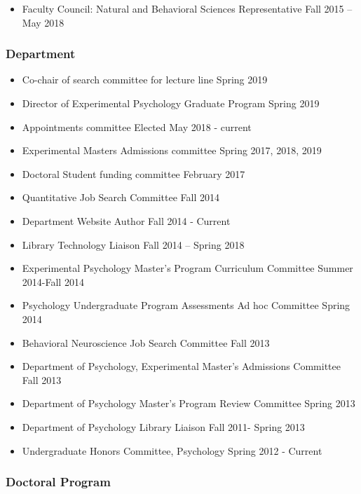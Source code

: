 \documentclass[11pt,a4paper,]{moderncv}
\providecommand{\tightlist}{%
	\setlength{\itemsep}{0pt}\setlength{\parskip}{0pt}}
\begin{document}
\begin{itemize}
\tightlist
\item
  Faculty Council: Natural and Behavioral Sciences Representative Fall 2015 -- May 2018
\end{itemize}

\hypertarget{department}{%
\subsubsection{Department}\label{department}}

\begin{itemize}
\tightlist
\item
  Co-chair of search committee for lecture line Spring 2019
\item
  Director of Experimental Psychology Graduate Program Spring 2019
\item
  Appointments committee Elected May 2018 - current
\item
  Experimental Masters Admissions committee Spring 2017, 2018, 2019
\item
  Doctoral Student funding committee February 2017
\item
  Quantitative Job Search Committee Fall 2014
\item
  Department Website Author Fall 2014 - Current
\item
  Library Technology Liaison Fall 2014 -- Spring 2018
\item
  Experimental Psychology Master's Program Curriculum Committee Summer 2014-Fall 2014
\item
  Psychology Undergraduate Program Assessments Ad hoc Committee Spring 2014
\item
  Behavioral Neuroscience Job Search Committee Fall 2013
\item
  Department of Psychology, Experimental Master's Admissions Committee Fall 2013
\item
  Department of Psychology Master's Program Review Committee Spring 2013
\item
  Department of Psychology Library Liaison Fall 2011- Spring 2013
\item
  Undergraduate Honors Committee, Psychology Spring 2012 - Current
\end{itemize}

\hypertarget{doctoral-program}{%
\subsubsection{Doctoral Program}\label{doctoral-program}}
\end{document}
